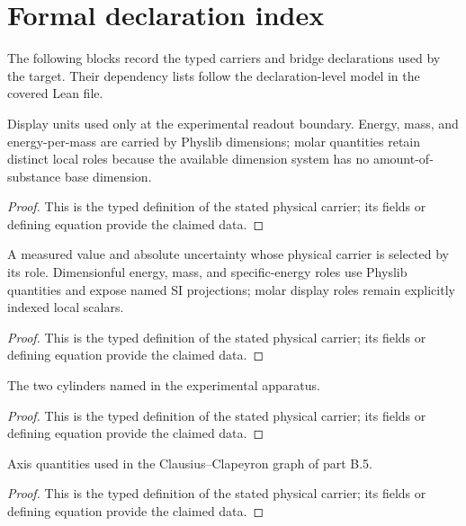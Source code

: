 \section*{Formal declaration index}
The following blocks record the typed carriers and bridge declarations used by the target.  Their dependency lists follow the declaration-level model in the covered Lean file.

\begin{definition}
  \label{def:physics:IPhO_2026_4_B_6:aux001}
  Display units used only at the experimental readout boundary.  Energy,
  mass, and energy-per-mass are carried by Physlib dimensions; molar
  quantities retain distinct local roles because the available dimension
  system has no amount-of-substance base dimension.
\end{definition}
\begin{proof}
  This is the typed definition of the stated physical carrier; its fields or defining equation provide the claimed data.
\end{proof}

\begin{definition}
  \label{def:physics:IPhO_2026_4_B_6:aux002}
  A measured value and absolute uncertainty whose physical carrier is selected
  by its role.  Dimensionful energy, mass, and specific-energy roles use
  Physlib quantities and expose named SI projections; molar display roles
  remain explicitly indexed local scalars.
\end{definition}
\begin{proof}
  This is the typed definition of the stated physical carrier; its fields or defining equation provide the claimed data.
\end{proof}

\begin{definition}
  \label{def:physics:IPhO_2026_4_B_6:aux003}
  The two cylinders named in the experimental apparatus.
\end{definition}
\begin{proof}
  This is the typed definition of the stated physical carrier; its fields or defining equation provide the claimed data.
\end{proof}

\begin{definition}
  \label{def:physics:IPhO_2026_4_B_6:aux004}
  Axis quantities used in the Clausius--Clapeyron graph of part B.5.
\end{definition}
\begin{proof}
  This is the typed definition of the stated physical carrier; its fields or defining equation provide the claimed data.
\end{proof}


